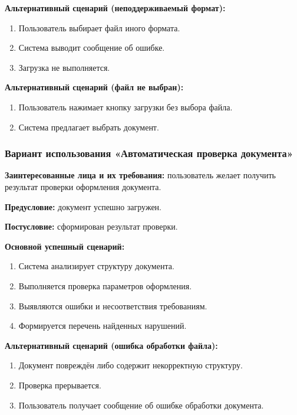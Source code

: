 \textbf{Альтернативный сценарий (неподдерживаемый формат):}

\begin{enumerate}
	\item Пользователь выбирает файл иного формата.
	\item Система выводит сообщение об ошибке.
	\item Загрузка не выполняется.
\end{enumerate}

\textbf{Альтернативный сценарий (файл не выбран):}

\begin{enumerate}
	\item Пользователь нажимает кнопку загрузки без выбора файла.
	\item Система предлагает выбрать документ.
\end{enumerate}

\subsubsection{Вариант использования «Автоматическая проверка документа»}

\textbf{Заинтересованные лица и их требования:} пользователь желает получить результат проверки оформления документа.

\textbf{Предусловие:} документ успешно загружен.

\textbf{Постусловие:} сформирован результат проверки.

\textbf{Основной успешный сценарий:}

\begin{enumerate}
	\item Система анализирует структуру документа.
	\item Выполняется проверка параметров оформления.
	\item Выявляются ошибки и несоответствия требованиям.
	\item Формируется перечень найденных нарушений.
\end{enumerate}

\textbf{Альтернативный сценарий (ошибка обработки файла):}

\begin{enumerate}
	\item Документ повреждён либо содержит некорректную структуру.
	\item Проверка прерывается.
	\item Пользователь получает сообщение об ошибке обработки документа.
\end{enumerate}

